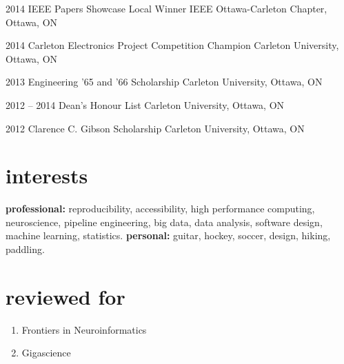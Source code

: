 \documentclass[]{friggeri-cv} %
\begin{document}
\begin{entrylist}
\vspace{-7pt}

\entry
{2014}
{IEEE Papers Showcase Local Winner}
{IEEE Ottawa-Carleton Chapter, Ottawa, ON}
{}
\vspace{-7pt}

\entry
{2014}
{Carleton Electronics Project Competition Champion}
{Carleton University, Ottawa, ON}
{}
\vspace{-7pt}

\entry
{2013}
{Engineering '65 and '66 Scholarship}
{Carleton University, Ottawa, ON}
{}
\vspace{-7pt}

\entry
{2012 -- 2014}
{Dean's Honour List}
{Carleton University, Ottawa, ON}
{}
\vspace{-7pt}

\entry
{2012}
{Clarence C. Gibson Scholarship}
{Carleton University, Ottawa, ON}
{}
\vspace{-7pt}
\end{entrylist}



\section{interests}

\textbf{professional:} reproducibility, accessibility, high performance computing, neuroscience,
pipeline engineering, big data, data analysis, software design, machine learning, statistics.
\textbf{personal:} guitar, hockey, soccer, design, hiking, paddling.

\section{reviewed for}
\begin{enumerate}
\item Frontiers in Neuroinformatics
\item Gigascience
\end{enumerate}
\end{document}
